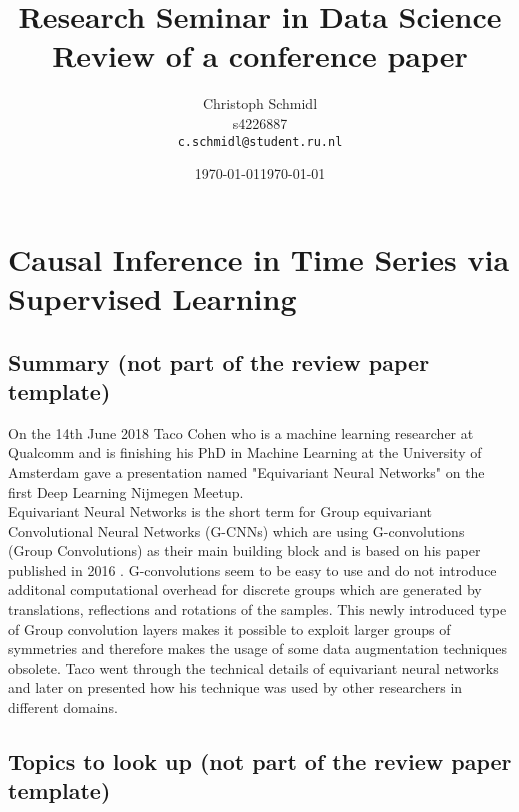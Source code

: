 \documentclass[a4paper]{article}
\title{Research Seminar in Data Science\\Review of a conference paper}
\author{
  Christoph Schmidl\\ s4226887\\      \texttt{c.schmidl@student.ru.nl}
}
\date{\today}
\date{\today}
\begin{document}
\maketitle





\section{Causal Inference in Time Series via Supervised Learning}

\subsection{Summary (not part of the review paper template)}

On the 14th June 2018 Taco Cohen who is a machine learning researcher at Qualcomm and is finishing his PhD in Machine Learning at the University of Amsterdam gave a presentation named "Equivariant Neural Networks" on the first Deep Learning Nijmegen Meetup.\\ 
Equivariant Neural Networks is the short term for Group equivariant Convolutional Neural Networks (G-CNNs) which are using G-convolutions (Group Convolutions) as their main building block and is based on his paper published in 2016 \cite{cohen2016group}. G-convolutions seem to be easy to use and do not introduce additonal computational overhead for discrete groups which are generated by translations, reflections and rotations of the samples. This newly introduced type of Group convolution layers makes it possible to exploit larger groups of symmetries and therefore makes the usage of some data augmentation techniques obsolete. Taco went through the technical details of equivariant neural networks and later on presented how his technique was used by other researchers in different domains.\\


\subsection{Topics to look up (not part of the review paper template)}
\end{document}
